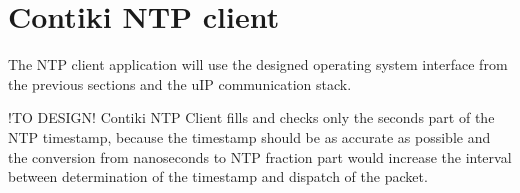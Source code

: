 
\section{Contiki NTP client}
The NTP client application will use the designed operating system interface
from the previous sections and the uIP communication stack.




!TO DESIGN!
Contiki NTP Client fills and checks only the seconds part of the NTP timestamp,
because the timestamp should be as accurate as possible and the
conversion from nanoseconds to NTP fraction part would increase the interval
between determination of the timestamp and dispatch of the packet.
